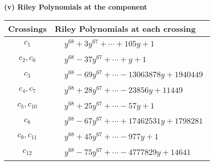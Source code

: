 \documentclass[1p]{elsarticle_modified}
\theoremstyle{definition}
\begin{document}
\newpage\renewcommand{\arraystretch}{1}
\flushleft \textbf{(v) Riley Polynomials at the component}\newline \\
\begin{tabular}{m{50pt}|m{274pt}}
Crossings & \hspace{64pt}Riley Polynomials at each crossing \\
\hline $$\begin{aligned}c_{1}\end{aligned}$$&$\begin{aligned}
&y^{68}+3 y^{67}+\cdots+105 y+1
\end{aligned}$\\
\hline $$\begin{aligned}c_{2},c_{6}\end{aligned}$$&$\begin{aligned}
&y^{68}-37 y^{67}+\cdots+y+1
\end{aligned}$\\
\hline $$\begin{aligned}c_{3}\end{aligned}$$&$\begin{aligned}
&y^{68}-69 y^{67}+\cdots-13063878 y+1940449
\end{aligned}$\\
\hline $$\begin{aligned}c_{4},c_{7}\end{aligned}$$&$\begin{aligned}
&y^{68}+28 y^{67}+\cdots-23856 y+11449
\end{aligned}$\\
\hline $$\begin{aligned}c_{5},c_{10}\end{aligned}$$&$\begin{aligned}
&y^{68}+25 y^{67}+\cdots-57 y+1
\end{aligned}$\\
\hline $$\begin{aligned}c_{8}\end{aligned}$$&$\begin{aligned}
&y^{68}-67 y^{67}+\cdots+17462531 y+1798281
\end{aligned}$\\
\hline $$\begin{aligned}c_{9},c_{11}\end{aligned}$$&$\begin{aligned}
&y^{68}+45 y^{67}+\cdots-977 y+1
\end{aligned}$\\
\hline $$\begin{aligned}c_{12}\end{aligned}$$&$\begin{aligned}
&y^{68}-75 y^{67}+\cdots-4777829 y+14641
\end{aligned}$\\
\hline
\end{tabular}\\~\\
\end{document}
